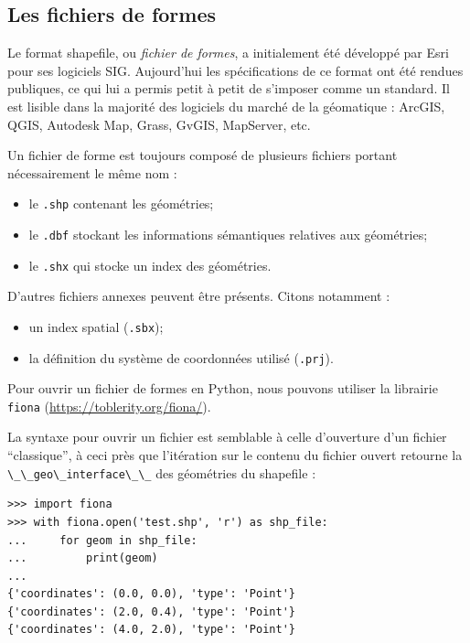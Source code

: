 \documentclass[11pt]{article}
\newcommand{\passthrough}[1]{#1}
\def\tightlist{}
\begin{document}
\hypertarget{les-fichiers-de-formes}{%
\subsection{Les fichiers de formes}\label{les-fichiers-de-formes}}

Le format shapefile, ou \emph{fichier de formes}, a initialement été
développé par Esri pour ses logiciels SIG. Aujourd'hui les
spécifications de ce format ont été rendues publiques, ce qui lui a
permis petit à petit de s'imposer comme un standard. Il est lisible dans
la majorité des logiciels du marché de la géomatique : ArcGIS, QGIS,
Autodesk Map, Grass, GvGIS, MapServer, etc.

Un fichier de forme est toujours composé de plusieurs fichiers portant
nécessairement le même nom :

\begin{itemize}
\tightlist
\item
  le \passthrough{\lstinline!.shp!} contenant les géométries;
\item
  le \passthrough{\lstinline!.dbf!} stockant les informations
  sémantiques relatives aux géométries;
\item
  le \passthrough{\lstinline!.shx!} qui stocke un index des géométries.
\end{itemize}

D'autres fichiers annexes peuvent être présents. Citons notamment :

\begin{itemize}
\tightlist
\item
  un index spatial (\passthrough{\lstinline!.sbx!});
\item
  la définition du système de coordonnées utilisé
  (\passthrough{\lstinline!.prj!}).
\end{itemize}

Pour ouvrir un fichier de formes en Python, nous pouvons utiliser la
librairie \passthrough{\lstinline!fiona!}
(\url{https://toblerity.org/fiona/}).

La syntaxe pour ouvrir un fichier est semblable à celle d'ouverture d'un
fichier ``classique'', à ceci près que l'itération sur le contenu du
fichier ouvert retourne la
\passthrough{\lstinline!\_\_geo\_interface\_\_!} des géométries du
shapefile :

\begin{lstlisting}
>>> import fiona
>>> with fiona.open('test.shp', 'r') as shp_file:
...     for geom in shp_file:
...         print(geom)
...
{'coordinates': (0.0, 0.0), 'type': 'Point'}
{'coordinates': (2.0, 0.4), 'type': 'Point'}
{'coordinates': (4.0, 2.0), 'type': 'Point'}
\end{lstlisting}
\end{document}
